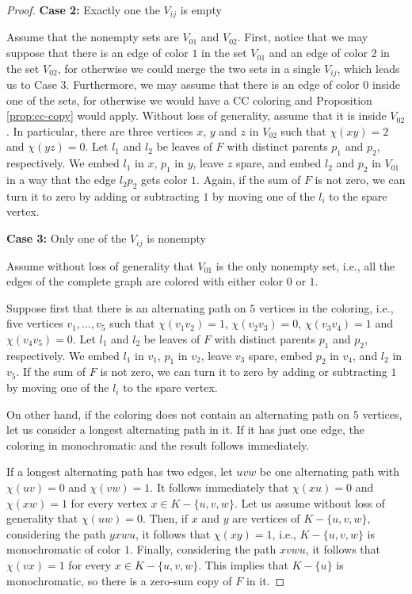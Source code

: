 \documentclass[11pt]{article}
\begin{document}
\begin{proof}
    \textbf{Case 2:} Exactly one the $V_{ij}$ is empty

    Assume that the nonempty sets are $V_{01}$ and $V_{02}$. First, notice that we may suppose that there is an edge of color $1$ in the set $V_{01}$ and an edge of color $2$ in the set $V_{02}$, for otherwise we could merge the two sets in a single $V_{ij}$, which leads us to Case 3. Furthermore, we may assume that there is an edge of color $0$ inside one of the sets, for otherwise we would have a CC coloring and Proposition \ref{prop:cc-copy} would apply. Without loss of generality, assume that it is inside $V_{02}$. In particular, there are three vertices $x$, $y$ and $z$ in $V_{02}$ such that $\chi(xy)=2$ and $\chi(yz)=0$. Let $l_1$ and $l_2$ be leaves of $F$ with distinct parents $p_1$ and $p_2$, respectively. We embed $l_1$ in $x$, $p_1$ in $y$, leave $z$ spare, and embed $l_2$ and $p_2$ in $V_{01}$ in a way that the edge $l_2p_2$ gets color $1$. Again, if the sum of $F$ is not zero, we can turn it to zero by adding or subtracting $1$ by moving one of the $l_i$ to the spare vertex.

    \medskip

    \textbf{Case 3:} Only one of the $V_{ij}$ is nonempty

    Assume without loss of generality that $V_{01}$ is the only nonempty set, i.e., all the edges of the complete graph are colored with either color $0$ or $1$.

    Suppose first that there is an alternating path on $5$ vertices in the coloring, i.e., five vertices $v_1, \dots, v_5$ such that $\chi(v_1v_2)=1$, $\chi(v_2v_3)=0$, $\chi(v_3v_4)=1$ and $\chi(v_4v_5)=0$. Let $l_1$ and $l_2$ be leaves of $F$ with distinct parents $p_1$ and $p_2$, respectively. We embed $l_1$ in $v_1$, $p_1$ in $v_2$, leave $v_3$ spare, embed $p_2$ in $v_4$, and $l_2$ in $v_5$. If the sum of $F$ is not zero, we can turn it to zero by adding or subtracting $1$ by moving one of the $l_i$ to the spare vertex.

    On other hand, if the coloring does not contain an alternating path on $5$ vertices, let us consider a longest alternating path in it. If it has just one edge, the coloring in monochromatic and the result follows immediately.

    If a longest alternating path has two edges, let $uvw$ be one alternating path with $\chi(uv)=0$ and $\chi(vw)=1$. It follows immediately that $\chi(xu)=0$ and $\chi(xw)=1$ for every vertex $x \in K-\{u,v,w\}$. Let us assume without loss of generality that $\chi(uw)=0$. Then, if $x$ and $y$ are vertices of $K-\{u,v,w\}$, considering the path $yxwu$, it follows that $\chi(xy)=1$, i.e., $K-\{u,v,w\}$ is monochromatic of color $1$. Finally, considering the path $xvwu$, it follows that $\chi(vx)=1$ for every $x \in K-\{u,v,w\}$. This implies that $K-\{u\}$ is monochromatic, so there is a zero-sum copy of $F$ in it. 


\end{proof}
\end{document}

